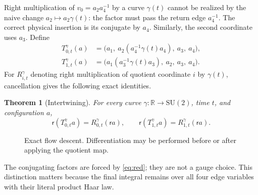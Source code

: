 \documentclass[11pt]{article}
\newtheorem{theorem}{Theorem}[section]
\theoremstyle{definition}
\newcommand{\SU}{\mathrm{SU}(2)}
\newcommand{\red}{\mathsf r}
\begin{document}
Right multiplication of $v_0=a_2a_4^{-1}$ by a curve $\gamma(t)$ cannot be
realized by the naive change $a_2\mapsto a_2\gamma(t)$: the factor must pass
the return edge $a_4^{-1}$.  The correct physical insertion is its conjugate
by $a_4$.  Similarly, the second coordinate uses $a_3$.  Define
\begin{align}
 T_{0,t}^{\gamma}(a)
   &=\bigl(a_1,\ a_2(a_4^{-1}\gamma(t)a_4),\ a_3,\ a_4\bigr),
   \label{eq:flow0}\\
 T_{1,t}^{\gamma}(a)
   &=\bigl(a_1(a_3^{-1}\gamma(t)a_3),\ a_2,\ a_3,\ a_4\bigr).
   \label{eq:flow1}
\end{align}
For $R_{i,t}^{\gamma}$ denoting right multiplication of quotient coordinate
$i$ by $\gamma(t)$, cancellation gives the following exact identities.

\begin{theorem}[Intertwining]\label{thm:intertwine}
For every curve $\gamma:\mathbb R\to\SU$, time $t$, and configuration $a$,
\begin{equation}\label{eq:intertwine}
 \red(T_{0,t}^{\gamma}a)=R_{0,t}^{\gamma}(\red a),\qquad
 \red(T_{1,t}^{\gamma}a)=R_{1,t}^{\gamma}(\red a).
\end{equation}
\end{theorem}

\begin{figure}[ht]
\centering
{}
\caption{Exact flow descent.  Differentiation may be performed before or
after applying the quotient map.}
\label{fig:square}
\end{figure}

The conjugating factors are forced by \eqref{eq:red}; they are not a gauge
choice.  This distinction matters because the final integral remains over
all four edge variables with their literal product Haar law.
\end{document}
